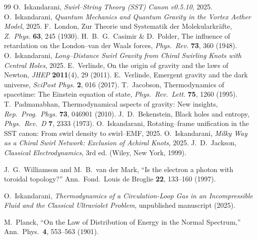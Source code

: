 \documentclass[11pt]{article}
\begin{document}


        
        \begin{thebibliography}{99}
             O.~Iskandarani, \emph{Swirl–String Theory (SST) Canon v0.5.10}, 2025.
             O.~Iskandarani, \emph{Quantum Mechanics and Quantum Gravity in the Vortex Aether Model}, 2025.
             F.~London, Zur Theorie und Systematik der Molekularkräfte, \emph{Z.~Phys.} \textbf{63}, 245 (1930).
             H.~B.~G.~Casimir \& D.~Polder, The influence of retardation on the London–van der Waals forces, \emph{Phys.~Rev.} \textbf{73}, 360 (1948).
             O.~Iskandarani, \emph{Long–Distance Swirl Gravity from Chiral Swirling Knots with Central Holes}, 2025.
             E.~Verlinde, On the origin of gravity and the laws of Newton, \emph{JHEP} \textbf{2011}(4), 29 (2011).
             E.~Verlinde, Emergent gravity and the dark universe, \emph{SciPost Phys.} \textbf{2}, 016 (2017).
             T.~Jacobson, Thermodynamics of spacetime: The Einstein equation of state, \emph{Phys.~Rev.~Lett.} \textbf{75}, 1260 (1995).
             T.~Padmanabhan, Thermodynamical aspects of gravity: New insights, \emph{Rep.~Prog.~Phys.} \textbf{73}, 046901 (2010).
             J.~D.~Bekenstein, Black holes and entropy, \emph{Phys.~Rev.~D} \textbf{7}, 2333 (1973).
             O.~Iskandarani, Rotating–frame unification in the SST canon: From swirl density to swirl–EMF, 2025.
             O.~Iskandarani, \emph{Milky Way as a Chiral Swirl Network: Exclusion of Achiral Knots}, 2025.
            J.~D.~Jackson,
            \emph{Classical Electrodynamics}, 3rd ed.
            (Wiley, New York, 1999).

            J.~G.~Williamson and M.~B.~van der Mark,
            ``Is the electron a photon with toroidal topology?''
            Ann.\ Fond.\ Louis de Broglie \textbf{22}, 133--160 (1997).

            O.~Iskandarani,
            \emph{Thermodynamics of a Circulation-Loop Gas in an Incompressible Fluid and the Classical Ultraviolet Problem},
            unpublished manuscript (2025).

            M.~Planck,
            ``On the Law of Distribution of Energy in the Normal Spectrum,''
            Ann.\ Phys.\ \textbf{4}, 553--563 (1901).
        \end{thebibliography}
\end{document}
